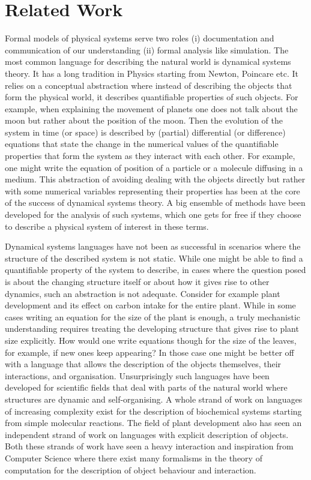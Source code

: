 \documentclass[phd]{infthesis}
\begin{document}
\chapter{Related Work}
\label{chp:oc}

Formal models of physical systems serve two roles (i) documentation and
communication of our understanding (ii) formal analysis like simulation. The
most common language for describing the natural world is dynamical systems
theory. It has a long tradition in Physics starting from Newton, Poincare
etc. It relies on a conceptual abstraction where instead of describing the
objects that form the physical world, it describes quantifiable properties of
such objects. For example, when explaining the movement of planets one does not
talk about the moon but rather about the position of the moon. Then the
evolution of the system in time (or space) is described by (partial)
differential (or difference) equations that state the change in the numerical
values of the quantifiable properties that form the system as they interact with
each other. For example, one
might write the equation of position of a particle or a molecule diffusing in a
medium. This abstraction of avoiding dealing with the objects directly but
rather with some numerical variables representing their properties has been at
the core of the success of dynamical systems theory. A big ensemble of methods
have been developed for the analysis of such systems, which one gets for free if
they choose to describe a physical system of interest in these terms.

Dynamical systems languages have not been as successful in scenarios where the
structure of the  described system is not static. While one might be able to
find a quantifiable property of the system to describe, in cases where the
question posed is about the changing structure itself or about how it gives rise
to other dynamics, such an abstraction is not adequate. Consider for example
plant development and its effect on carbon intake for the entire
plant. While in some cases writing an equation for the size of the plant is
enough, a truly mechanistic understanding requires treating the developing structure that
gives rise to plant size explicitly. How would one write equations though for the size
of the leaves, for example, if new ones keep appearing?
In those case one might be better off with a language that allows the
description of the objects themselves, their interactions, and
organisation. Unsurprisingly such languages have been developed for
scientific fields that deal with parts of the natural world where structures are
dynamic and self-organising. A whole strand of work on languages of
increasing complexity exist for the description of biochemical systems starting
from simple molecular reactions. The field of plant development also has seen an
independent strand of work on languages with explicit description of objects.
Both these strands of work have seen a heavy interaction and inspiration %
from Computer Science where there exist many formalisms in the
theory of computation for the description of object behaviour and interaction.
\end{document}
